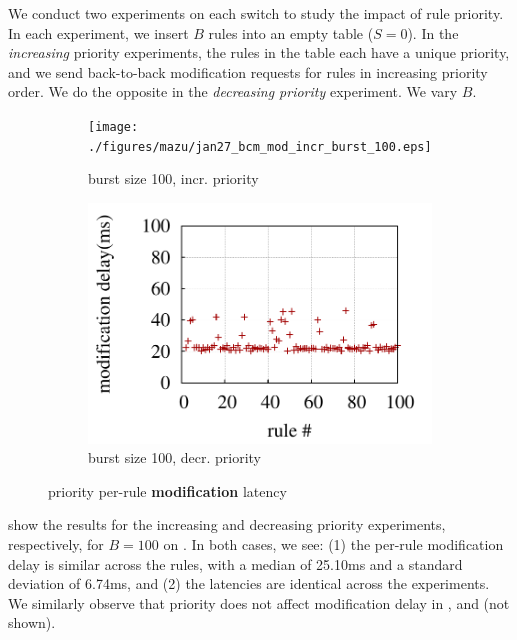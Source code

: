  We conduct two experiments on each switch to
study the impact of rule priority. In
each experiment, we insert $B$ rules into an empty table ($S = 0$). In the 
{\em increasing} priority experiments, the rules in the table each have a
unique priority, and we send back-to-back modification requests for
rules in increasing priority order. We do the opposite in the {\em
decreasing priority} experiment. We vary $B$.%

\begin{figure}[!t]
	\centering
	\begin{subfigure}[b]{0.40\textwidth}
                \centering
		\texttt{[image: ./figures/mazu/jan27\_bcm\_mod\_incr\_burst\_100.eps]}
		\caption{burst size 100, incr. priority}
		\label{fig:bcm_mod_incr_burst_100}
	\end{subfigure}
        \begin{subfigure}[b]{0.40\textwidth}
                \centering
		\includegraphics[width=\textwidth]{./figures/mazu/jan27_bcm_mod_decr_burst_100-eps-converted-to.pdf}
		\caption{burst size 100, decr. priority}
		\label{fig:bcm_mod_decr_burst_100}
	\end{subfigure}
	\caption{{\bf \BroadcomOne} priority per-rule {\bf modification} latency}
	\label{fig:priority-broadcom-modify}
\end{figure}

 show the results for the increasing and decreasing priority experiments, respectively, for
$B=100$ on \BroadcomOne. In both cases, we see: (1) the per-rule modification delay is similar
across the rules, with a median of 25.10ms and a standard deviation of
6.74ms, and (2) the latencies are identical across the experiments. 
We similarly observe that priority does not affect modification delay in
\BroadcomThree, \Intel and \IBM (not shown).


